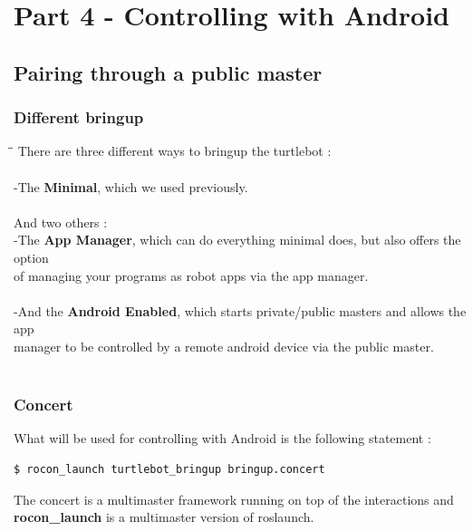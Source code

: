 \documentclass[10pt,a4paper]{article}
\begin{document}
\section{Part 4 - Controlling with Android}

\subsection{Pairing through a public master}

\subsubsection{Different bringup}

\begin{tabbing}
\hspace{1cm}\=\hspace{1cm}\=\kill
There are three different ways to bringup the turtlebot :\\\\

\> -The \textbf{Minimal}, which we used previously.\\\\



 And two others : \\
\> -The \textbf{App Manager}, which can do everything minimal does, but also offers the option \\ of managing your programs as robot apps via the app manager.\\\\

\> -And the \textbf{Android Enabled}, which starts private/public masters and allows the app \\ manager to be controlled by a remote android device via the public master.\\\\
\end{tabbing}

\subsubsection{Concert}

What will be used for controlling with Android is the following statement : 
\begin{lstlisting}[frame=single]
$ rocon_launch turtlebot_bringup bringup.concert
\end{lstlisting}


 The concert is a multimaster framework running on top of the interactions and \textbf{rocon\_launch} is a multimaster version of roslaunch.\\
 
\end{document}
